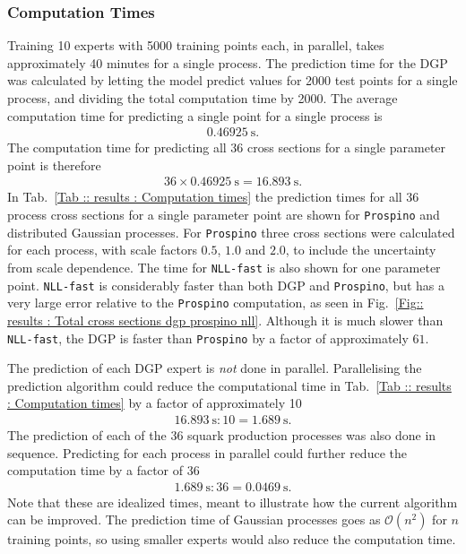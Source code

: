 \documentclass[twoside,english]{uiofysmaster}
\begin{document}
\subsubsection{Computation Times}

Training 10 experts with 5000 training points each, in parallel, takes approximately 40 minutes for a single process. The prediction time for the DGP was calculated by letting the model predict values for 2000 test points for a  single process, and dividing the total computation time by 2000. The average computation time for predicting a single point for a single process is
\begin{align}
0.46925~\mathrm{s}.
\end{align}
The computation time for predicting all 36 cross sections for a single parameter point is therefore
\begin{align}
36 \times 0.46925~\mathrm{s} = 16.893~\mathrm{s}.
\end{align}
In Tab.~\ref{Tab :: results : Computation times} the prediction times for all 36 process cross sections for a single parameter point are shown for \verb|Prospino| and distributed Gaussian processes. For \verb|Prospino| three cross sections were calculated for each process, with scale factors $0.5$, $1.0$ and $2.0$, to include the uncertainty from scale dependence. The time for \verb|NLL-fast| is also shown for one parameter point.  \verb|NLL-fast| is considerably faster than both DGP and \verb|Prospino|, but has a very large error relative to the \verb|Prospino| computation, as seen in Fig.~\ref{Fig:: results : Total cross sections dgp prospino nll}. Although it is much slower than \verb|NLL-fast|, the DGP is faster than \verb|Prospino| by a factor of approximately $61$.

The prediction of each DGP expert is \textit{not} done in parallel. Parallelising the prediction algorithm could reduce the computational time in Tab.~\ref{Tab :: results : Computation times} by a factor of approximately 10
\begin{align*}
16.893~\mathrm{s} : 10 = 1.689~\mathrm{s}. 
\end{align*}
The prediction of each of the 36 squark production processes was also done in sequence. Predicting for each process in parallel could further reduce the computation time by a factor of 36
\begin{align*}
1.689~\mathrm{s} : 36 = 0.0469~\mathrm{s}.
\end{align*}
Note that these are idealized times, meant to illustrate how the current algorithm can be improved. The prediction time of Gaussian processes goes as $\mathcal{O}(n^2)$ for $n$ training points, so using smaller experts would also reduce the computation time.
\end{document}
